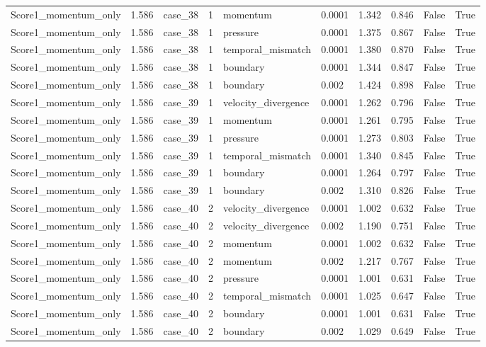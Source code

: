 \begin{longtable}{llllllllll}
Score1\_momentum\_only & 1.586 & case\_38 & 1 & momentum & 0.0001 & 1.342 & 0.846 & False & True \\
Score1\_momentum\_only & 1.586 & case\_38 & 1 & pressure & 0.0001 & 1.375 & 0.867 & False & True \\
Score1\_momentum\_only & 1.586 & case\_38 & 1 & temporal\_mismatch & 0.0001 & 1.380 & 0.870 & False & True \\
Score1\_momentum\_only & 1.586 & case\_38 & 1 & boundary & 0.0001 & 1.344 & 0.847 & False & True \\
Score1\_momentum\_only & 1.586 & case\_38 & 1 & boundary & 0.002 & 1.424 & 0.898 & False & True \\
Score1\_momentum\_only & 1.586 & case\_39 & 1 & velocity\_divergence & 0.0001 & 1.262 & 0.796 & False & True \\
Score1\_momentum\_only & 1.586 & case\_39 & 1 & momentum & 0.0001 & 1.261 & 0.795 & False & True \\
Score1\_momentum\_only & 1.586 & case\_39 & 1 & pressure & 0.0001 & 1.273 & 0.803 & False & True \\
Score1\_momentum\_only & 1.586 & case\_39 & 1 & temporal\_mismatch & 0.0001 & 1.340 & 0.845 & False & True \\
Score1\_momentum\_only & 1.586 & case\_39 & 1 & boundary & 0.0001 & 1.264 & 0.797 & False & True \\
Score1\_momentum\_only & 1.586 & case\_39 & 1 & boundary & 0.002 & 1.310 & 0.826 & False & True \\
Score1\_momentum\_only & 1.586 & case\_40 & 2 & velocity\_divergence & 0.0001 & 1.002 & 0.632 & False & True \\
Score1\_momentum\_only & 1.586 & case\_40 & 2 & velocity\_divergence & 0.002 & 1.190 & 0.751 & False & True \\
Score1\_momentum\_only & 1.586 & case\_40 & 2 & momentum & 0.0001 & 1.002 & 0.632 & False & True \\
Score1\_momentum\_only & 1.586 & case\_40 & 2 & momentum & 0.002 & 1.217 & 0.767 & False & True \\
Score1\_momentum\_only & 1.586 & case\_40 & 2 & pressure & 0.0001 & 1.001 & 0.631 & False & True \\
Score1\_momentum\_only & 1.586 & case\_40 & 2 & temporal\_mismatch & 0.0001 & 1.025 & 0.647 & False & True \\
Score1\_momentum\_only & 1.586 & case\_40 & 2 & boundary & 0.0001 & 1.001 & 0.631 & False & True \\
Score1\_momentum\_only & 1.586 & case\_40 & 2 & boundary & 0.002 & 1.029 & 0.649 & False & True \\

\end{longtable}
